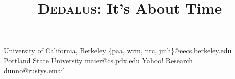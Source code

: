 \documentclass{sigplanconf}
\def\lang{\textsc{Dedalus}\xspace}
\begin{document}
\copyrightdata{[to be supplied]}

\title{{\huge{\bf\lang}}:
It's About Time} 
%


           {University of California, Berkeley}
           {\{paa, wrm, nrc, jmh\}@eecs.berkeley.edu}
           {Portland State University}
           {maier@cs.pdx.edu}
           {Yahoo! Research}
           {dunno@rustys.email}



\maketitle
\end{document}
